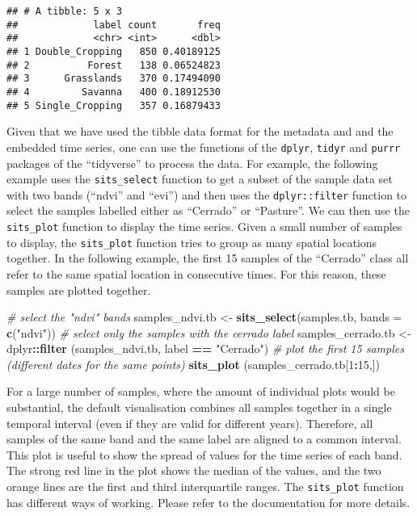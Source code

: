 \documentclass[11pt,]{article}
\newenvironment{Shaded}{\begin{snugshade}}{\end{snugshade}}
\newcommand{\KeywordTok}[1]{\textcolor[rgb]{0.13,0.29,0.53}{\textbf{#1}}}
\newcommand{\DataTypeTok}[1]{\textcolor[rgb]{0.13,0.29,0.53}{#1}}
\newcommand{\DecValTok}[1]{\textcolor[rgb]{0.00,0.00,0.81}{#1}}
\newcommand{\StringTok}[1]{\textcolor[rgb]{0.31,0.60,0.02}{#1}}
\newcommand{\CommentTok}[1]{\textcolor[rgb]{0.56,0.35,0.01}{\textit{#1}}}
\newcommand{\OperatorTok}[1]{\textcolor[rgb]{0.81,0.36,0.00}{\textbf{#1}}}
\newcommand{\NormalTok}[1]{#1}
\begin{document}
\begin{verbatim}
## # A tibble: 5 x 3
##             label count       freq
##             <chr> <int>      <dbl>
## 1 Double_Cropping   850 0.40189125
## 2          Forest   138 0.06524823
## 3      Grasslands   370 0.17494090
## 4         Savanna   400 0.18912530
## 5 Single_Cropping   357 0.16879433
\end{verbatim}

Given that we have used the tibble data format for the metadata and and
the embedded time series, one can use the functions of the
\texttt{dplyr}, \texttt{tidyr} and \texttt{purrr} packages of the
``tidyverse'' \citep{Wickham2017} to process the data. For example, the
following example uses the \texttt{sits\_select} function to get a
subset of the sample data set with two bands (``ndvi'' and ``evi'') and
then uses the \texttt{dplyr::filter} function to select the samples
labelled either as ``Cerrado'' or ``Pasture''. We can then use the
\texttt{sits\_plot} function to display the time series. Given a small
number of samples to display, the \texttt{sits\_plot} function tries to
group as many spatial locations together. In the following example, the
first 15 samples of the ``Cerrado'' class all refer to the same spatial
location in consecutive times. For this reason, these samples are
plotted together.

\begin{Shaded}
\begin{Highlighting}[]
\CommentTok{# select the "ndvi" bands}
\NormalTok{samples_ndvi.tb <-}\StringTok{ }\KeywordTok{sits_select}\NormalTok{(samples.tb, }\DataTypeTok{bands =} \KeywordTok{c}\NormalTok{(}\StringTok{"ndvi"}\NormalTok{))}
\CommentTok{# select only the samples with the cerrado label}
\NormalTok{samples_cerrado.tb <-}\StringTok{ }\NormalTok{dplyr}\OperatorTok{::}\KeywordTok{filter}\NormalTok{ (samples_ndvi.tb, label }\OperatorTok{==}\StringTok{ "Cerrado"}\NormalTok{)}
\CommentTok{# plot the first 15 samples (different dates for the same points)}
\KeywordTok{sits_plot}\NormalTok{ (samples_cerrado.tb[}\DecValTok{1}\OperatorTok{:}\DecValTok{15}\NormalTok{,])}
\end{Highlighting}
\end{Shaded}

For a large number of samples, where the amount of individual plots
would be substantial, the default visualisation combines all samples
together in a single temporal interval (even if they are valid for
different years). Therefore, all samples of the same band and the same
label are aligned to a common interval. This plot is useful to show the
spread of values for the time series of each band. The strong red line
in the plot shows the median of the values, and the two orange lines are
the first and third interquartile ranges. The \texttt{sits\_plot}
function has different ways of working. Please refer to the
documentation for more details.
\end{document}
